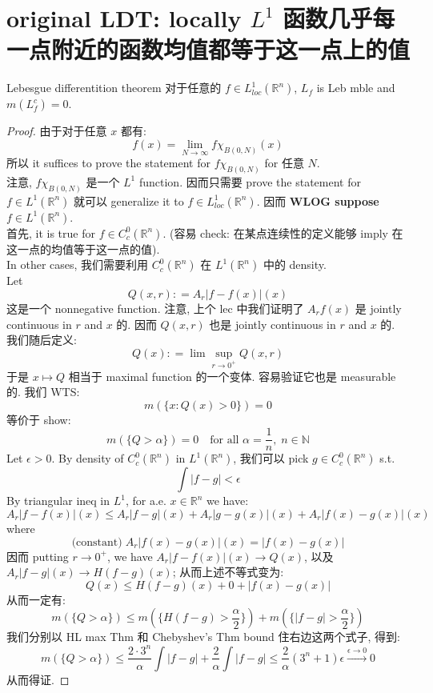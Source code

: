 \documentclass[lang=cn,11pt]{elegantbook}
\begin{document}
\section{original LDT: locally $L^1$ 函数几乎每一点附近的函数均值都等于这一点上的值}
\begin{theorem}{Lebesgue differentition theorem}
对于任意的 $f\in L^1_{loc}(\mathbb{R}^n)$, $L_f$ is Leb mble and $m(L_f^c) = 0$.
\end{theorem}
\begin{proof}
由于对于任意 $x$ 都有: \[
    f(x)  = \lim_{N\to \infty} f  \chi_{B(0,N)} (x)
    \]所以 it suffices to prove the statement for $f\chi_{B(0,N)}$ for 任意 $N$.\\
注意, $f \chi_{B(0,N)}$ 是一个 $L^1$ function. 因而只需要 prove the statement for $f \in L^1(\mathbb{R}^n)$ 就可以 generalize it to $f \in L_{loc}^1 (\mathbb{R}^n)$. 因而 \textbf{WLOG suppose $f \in L^1(\mathbb{R}^n)$}. \\
首先, it is true for $f \in C_c^0(\mathbb{R}^n)$. (容易 check: 在某点连续性的定义能够 imply 在这一点的均值等于这一点的值).  \\
In other cases, 我们需要利用 $ C_c^0(\mathbb{R}^n)$ 在 $L^1(\mathbb{R}^n)$ 中的 density.\\
Let$$Q(x,r) : =  A_r |f-f(x)| (x) $$
这是一个 nonnegative function. 注意, 上个 lec 中我们证明了 $A_r f(x)$ 是 jointly continuous in $r$ and $x$ 的. 因而 $Q(x,r)$ 也是 jointly continuous in $r$ and $x$ 的. \\
我们随后定义: \[
Q(x) : = \lim \sup_{r\to 0^+} Q(x,r)
\]
于是 $x\mapsto Q$ 相当于 maximal function 的一个变体. 容易验证它也是 measurable 的. 我们 WTS: \[
m(\{x: Q(x) > 0\}) = 0
\]
等价于 show: \[
m(\{Q > \alpha \}) = 0 \quad \text{for all } \alpha  = \frac{1}{n}, \; n\in \mathbb{N}
\]
Let $\epsilon > 0$. By density of $ C_c^0(\mathbb{R}^n)$ in $L^1(\mathbb{R}^n)$, 我们可以 pick $g \in  C_c^0(\mathbb{R}^n)$ s.t.  \[
\int |f-g| < \epsilon
\]By triangular ineq in $L^1$,  for a.e. $x\in\mathbb{R}^n$ we have: \[
A_r |f - f(x)| (x) \leq A_r |f -g| (x) + A_r |g -g(x)| (x) + A_r|f(x)-g(x)| (x)
\]
where \[
\text{(constant)}\; A_r|f(x)-g(x)| (x) = |f(x) - g(x)|
\]
因而 putting $r\to 0^+$, we have $A_r |f - f(x)| (x) \to Q(x)$, 以及  $A_r |f -g| (x) \to H(f-g) (x)$; 从而上述不等式变为: \[
Q(x) \leq H(f-g) (x)  + 0  + |f(x) - g(x)| 
\]
从而一定有: \[
m(\{Q > \alpha \}) \leq m(\{H(f-g) > \frac{\alpha}{2}\}) + m(\{|f-g| > \frac{\alpha}{2}\})
\]
我们分别以 HL max Thm 和 Chebyshev's Thm bound 住右边这两个式子, 得到: \[
m(\{Q > \alpha \}) \leq  \frac{2 \cdot 3^n}{\alpha} \int |f-g| + \frac{2}{\alpha} \int |f-g| \leq \frac{2}{\alpha} (3^n+1) \epsilon \overset{\epsilon \to 0}{\longrightarrow} 0 
\]从而得证.
\end{proof}
\end{document}
